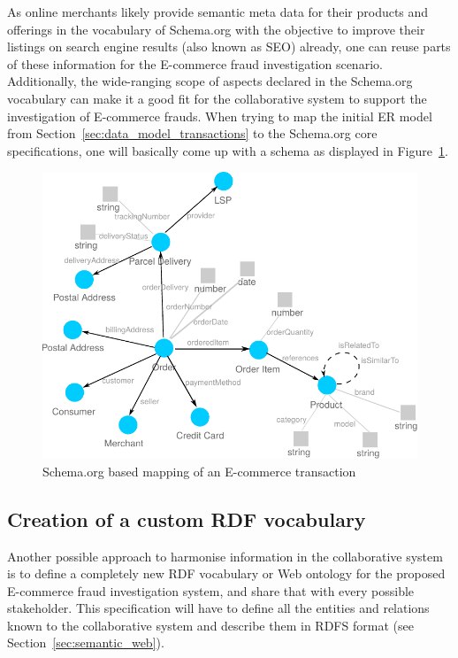 As online merchants likely provide semantic meta data for their products and offerings in the vocabulary of Schema.org with the objective to improve their listings on search engine results (also known as \gls{SEO}) already, one can reuse parts of these information for the \gls{E-commerce} fraud investigation scenario. Additionally, the wide-ranging scope of aspects declared in the Schema.org vocabulary can make it a good fit for the collaborative system to support the investigation of \gls{E-commerce} frauds. When trying to map the initial \gls{ER} model from Section~\ref{sec:data_model_transactions} to the Schema.org core specifications, one will basically come up with a schema as displayed in Figure~\ref{fig:images_schema_org}. \@

\begin{figure}[H]
	\centering
		\includegraphics[width=0.8\columnwidth]{images/schema_org_mapping.pdf}
	\caption{Schema.org based mapping of an \gls{E-commerce} transaction}
\label{fig:images_schema_org}
\end{figure}


\subsection{Creation of a custom \gls{RDF} vocabulary}
\label{subsec:build_ontology_frauds}

Another possible approach to harmonise information in the collaborative system is to define a completely new \gls{RDF} vocabulary or Web ontology for the proposed \gls{E-commerce} fraud investigation system, and share that with every possible stakeholder. This specification will have to define all the entities and relations known to the collaborative system and describe them in \gls{RDFS} format (see Section~\ref{sec:semantic_web}). \\

